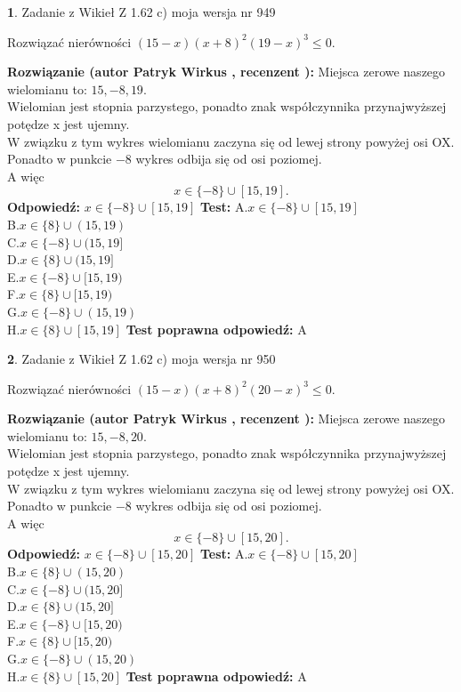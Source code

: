 \documentclass[12pt, a4paper]{article}
\theoremstyle{definition} %
\newtheorem{zad}{}
\newcommand{\zadStart}[1]{\begin{zad}#1\newline}
\newcommand{\zadStop}{\end{zad}}
\newcommand{\rozwStart}[2]{\noindent \textbf{Rozwiązanie (autor #1 , recenzent #2): }\newline}
\newcommand{\rozwStop}{\newline}
\newcommand{\odpStart}{\noindent \textbf{Odpowiedź:}\newline}
\newcommand{\odpStop}{\newline}
\newcommand{\testStart}{\noindent \textbf{Test:}\newline}
\newcommand{\testStop}{\newline}
\newcommand{\kluczStart}{\noindent \textbf{Test poprawna odpowiedź:}\newline}
\newcommand{\kluczStop}{\newline}
\begin{document}
\zadStart{Zadanie z Wikieł Z 1.62 c) moja wersja nr 949}

Rozwiązać nierówności $(15-x)(x+8)^{2}(19-x)^{3}\le0$.
\zadStop
\rozwStart{Patryk Wirkus}{}
Miejsca zerowe naszego wielomianu to: $15, -8, 19$.\\
Wielomian jest stopnia parzystego, ponadto znak współczynnika przy\linebreak najwyższej potędze x jest ujemny.\\ W związku z tym wykres wielomianu zaczyna się od lewej strony powyżej osi OX.\\
Ponadto w punkcie $-8$ wykres odbija się od osi poziomej.\\
A więc $$x \in \{-8\} \cup [15,19].$$
\rozwStop
\odpStart
$x \in \{-8\} \cup [15,19]$
\odpStop
\testStart
A.$x \in \{-8\} \cup [15,19]$\\
B.$x \in \{8\} \cup (15,19)$\\
C.$x \in \{-8\} \cup (15,19]$\\
D.$x \in \{8\} \cup (15,19]$\\
E.$x \in \{-8\} \cup [15,19)$\\
F.$x \in \{8\} \cup [15,19)$\\
G.$x \in \{-8\} \cup (15,19)$\\
H.$x \in \{8\} \cup [15,19]$
\testStop
\kluczStart
A
\kluczStop



\zadStart{Zadanie z Wikieł Z 1.62 c) moja wersja nr 950}

Rozwiązać nierówności $(15-x)(x+8)^{2}(20-x)^{3}\le0$.
\zadStop
\rozwStart{Patryk Wirkus}{}
Miejsca zerowe naszego wielomianu to: $15, -8, 20$.\\
Wielomian jest stopnia parzystego, ponadto znak współczynnika przy\linebreak najwyższej potędze x jest ujemny.\\ W związku z tym wykres wielomianu zaczyna się od lewej strony powyżej osi OX.\\
Ponadto w punkcie $-8$ wykres odbija się od osi poziomej.\\
A więc $$x \in \{-8\} \cup [15,20].$$
\rozwStop
\odpStart
$x \in \{-8\} \cup [15,20]$
\odpStop
\testStart
A.$x \in \{-8\} \cup [15,20]$\\
B.$x \in \{8\} \cup (15,20)$\\
C.$x \in \{-8\} \cup (15,20]$\\
D.$x \in \{8\} \cup (15,20]$\\
E.$x \in \{-8\} \cup [15,20)$\\
F.$x \in \{8\} \cup [15,20)$\\
G.$x \in \{-8\} \cup (15,20)$\\
H.$x \in \{8\} \cup [15,20]$
\testStop
\kluczStart
A
\kluczStop
\end{document}
